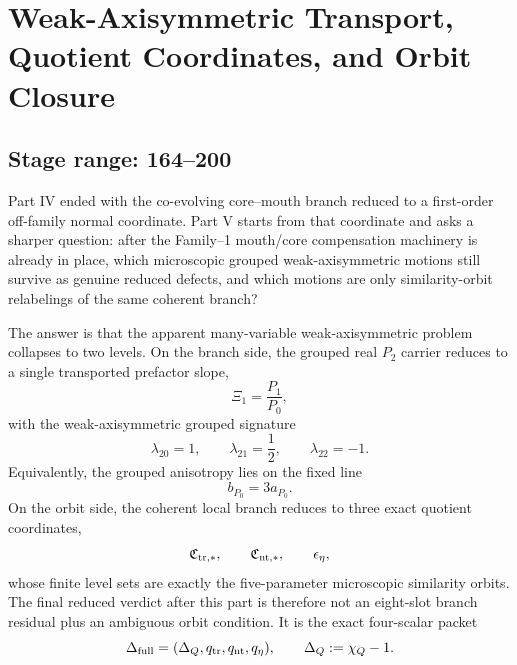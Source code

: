 \chapter{Weak-Axisymmetric Transport, Quotient Coordinates, and Orbit Closure}
\label{chap:part05_weak_axisymmetric_orbit}

\section*{Stage range: 164--200}

Part IV ended with the co-evolving core--mouth branch reduced to a first-order off-family normal coordinate.  Part V starts from that coordinate and asks a sharper question: after the Family--1 mouth/core compensation machinery is already in place, which microscopic grouped weak-axisymmetric motions still survive as genuine reduced defects, and which motions are only similarity-orbit relabelings of the same coherent branch?

The answer is that the apparent many-variable weak-axisymmetric problem collapses to two levels.  On the branch side, the grouped real \(P_2\) carrier reduces to a single transported prefactor slope,
\begin{equation}
\label{eq:part05-intro-xi1}
\Xi_1=\frac{P_1}{P_0},
\end{equation}
with the weak-axisymmetric grouped signature
\begin{equation}
\label{eq:part05-intro-lambda-signature}
\lambda_{20}=1,
\qquad
\lambda_{21}=\frac12,
\qquad
\lambda_{22}=-1.
\end{equation}
Equivalently, the grouped anisotropy lies on the fixed line
\begin{equation}
\label{eq:part05-intro-b3a}
b_{P_0}=3a_{P_0}.
\end{equation}
On the orbit side, the coherent local branch reduces to three exact quotient coordinates,
\begin{equation}
\label{eq:part05-intro-quotient-coordinates}
\mathfrak C_{{\rm tr},*},
\qquad
\mathfrak C_{{\rm nt},*},
\qquad
\epsilon_\eta,
\end{equation}
whose finite level sets are exactly the five-parameter microscopic similarity orbits.  The final reduced verdict after this part is therefore not an eight-slot branch residual plus an ambiguous orbit condition.  It is the exact four-scalar packet
\begin{equation}
\label{eq:part05-intro-final-packet}
\Delta_{\rm full}
=
(\Delta_Q,q_{\rm tr},q_{\rm nt},q_\eta),
\qquad
\Delta_Q:=\chi_Q-1.
\end{equation}

